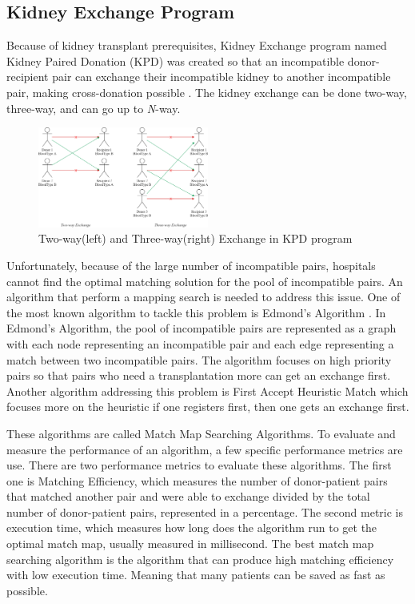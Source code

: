 \documentclass[conference]{IEEEtran}
\begin{document}
\subsection{Kidney Exchange Program}
Because of kidney transplant prerequisites, Kidney Exchange program named Kidney Paired Donation (KPD) was created
so that an incompatible donor-recipient pair can exchange their incompatible kidney to another incompatible
pair, making cross-donation possible \cite{raja}. The kidney exchange can be done two-way, three-way, and can
go up to \textit{N}-way.

\begin{figure}[h]
    \includegraphics[width=0.5\textwidth]{images/kidney-exchange.png}
    \caption{Two-way(left) and Three-way(right) Exchange in KPD program}
\end{figure}

Unfortunately, because of the large number of incompatible pairs, hospitals cannot find the optimal
matching solution for the pool of incompatible pairs. An algorithm that perform a mapping search is needed
to address this issue. One of the most known algorithm to tackle this problem is Edmond's Algorithm \cite{raja}.
In Edmond's Algorithm, the pool of incompatible pairs are represented as a graph with each node representing
an incompatible pair and each edge representing a match between two incompatible pairs. The algorithm focuses on
high priority pairs so that pairs who need a transplantation more can get an exchange first.
Another algorithm addressing this problem is First Accept Heuristic Match \cite{raja} which focuses more on the
heuristic if one registers first, then one gets an exchange first.

These algorithms are called Match Map Searching Algorithms. To evaluate and measure the performance of an algorithm,
a few specific performance metrics are use\cite{tullis}. There are two performance metrics to evaluate these
algorithms. The first one is Matching Efficiency, which measures the number of donor-patient pairs that matched
another pair and were able to exchange divided by the total number of donor-patient pairs, represented in a percentage.
The second metric is execution time, which measures how long does the algorithm run to get the optimal match map,
usually measured in millisecond. The best match map searching algorithm is the algorithm that can produce high matching
efficiency with low execution time. Meaning that many patients can be saved as fast as possible.
\end{document}
